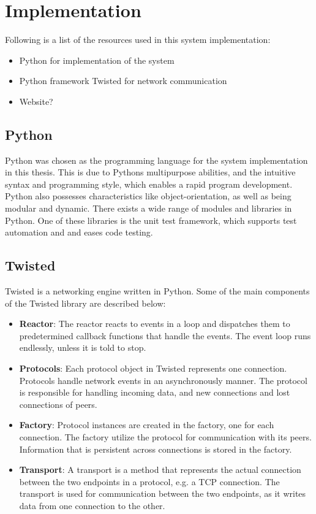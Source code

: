 \chapter{Implementation}
Following is a list of the resources used in this system implementation:
\begin{itemize}
\item Python for implementation of the system
\item Python framework Twisted for network communication
\item Website?
\end{itemize}

\section{Python}
Python \cite{python} was chosen as the programming language for the system implementation in this thesis. This is due to Pythons multipurpose abilities, and the intuitive syntax and programming style, which enables a rapid program development. Python also possesses characteristics like object-orientation, as well as being modular and dynamic. There exists a wide range of modules and libraries in Python. One of these libraries is the unit test framework, which supports test automation and and eases code testing.

\section{Twisted}
Twisted \cite{twisted} is a networking engine written in Python.
Some of the main components of the Twisted library are described below:
\begin{itemize}
\item \textbf{Reactor}: The reactor reacts to events in a loop and dispatches them to predetermined callback functions that handle the events. The event loop runs endlessly, unless it is told to stop. 

\item \textbf{Protocols}: Each protocol object in Twisted represents one connection. Protocols handle network events in an asynchronously manner. The protocol is responsible for handling incoming data, and new connections and lost connections of peers.

\item \textbf{Factory}: Protocol instances are created in the factory, one for each connection. The factory utilize the protocol for communication with its peers. Information that is persistent across connections is stored in the factory.

\item \textbf{Transport}: A transport is a method that represents the actual connection between the two endpoints in a protocol, e.g. a TCP connection. The transport is used for communication between the two endpoints, as it writes data from one connection to the other.
\end{itemize}
